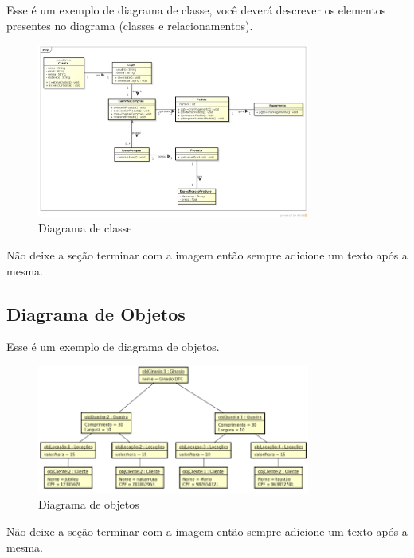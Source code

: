\documentclass[
  a4paper,%
  12pt,%
  english,%
  brazilian,%
]{article}
\begin{document}
    Esse é um exemplo de diagrama de classe, você deverá descrever os elementos presentes no diagrama (classes e relacionamentos).

    \begin{figure}[h]
\centering
\caption{Diagrama de classe}%
\label{fig:diagrama-classe}
 \includegraphics[width=0.8\textwidth]{Logos/diagramaclasse.png}
\end{figure}

     Não deixe a seção terminar com a imagem então sempre adicione um texto após a mesma.

    \subsection*{Diagrama de Objetos}

Esse é um exemplo de diagrama de objetos.

        \begin{figure}[h]
\centering
\caption{Diagrama de objetos}%
\label{fig:diagrama-objetos}
 \includegraphics[width=0.8\textwidth]{Logos/diagrama_objetos.png}
\end{figure}

Não deixe a seção terminar com a imagem então sempre adicione um texto após a mesma.
\end{document}
